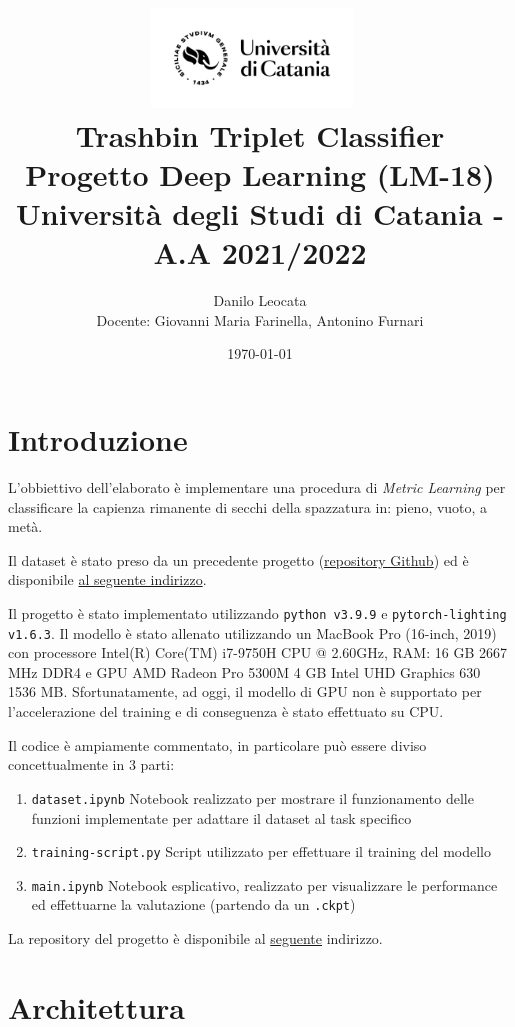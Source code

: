\documentclass[11pt]{article}
\title{ %
\includegraphics[width=0.4\textwidth]{UniCT-Logo-Nero}~\\
Trashbin Triplet Classifier \\ 
\large Progetto Deep Learning (LM-18) \\ Università degli Studi di Catania - A.A 2021/2022 \\
}
\author{ Danilo Leocata \\ Docente: Giovanni Maria Farinella, Antonino Furnari}
\date{\today}
\begin{document}
\maketitle	
\pagebreak


\section{Introduzione}

L'obbiettivo dell'elaborato è implementare una procedura di \textit{Metric Learning} per classificare la 
capienza rimanente di secchi della spazzatura in: pieno, vuoto, a metà.

Il dataset è stato preso da un precedente progetto (\href{https://github.com/khalld/trashbin-classifier}{repository Github}) ed è disponibile \href{https://drive.google.com/drive/folders/11SGtZrM8BWJDPOcnKR7RjLJs0dJOfSCA?usp=sharing}{al seguente indirizzo}.

Il progetto è stato implementato utilizzando \texttt{python v3.9.9} e \texttt{pytorch-lighting v1.6.3}. Il modello è stato allenato utilizzando un MacBook Pro (16-inch, 2019) con processore Intel(R) Core(TM) i7-9750H CPU @ 2.60GHz, RAM: 16 GB 2667 MHz DDR4 e GPU AMD Radeon Pro 5300M 4 GB
Intel UHD Graphics 630 1536 MB. Sfortunatamente, ad oggi, il modello di GPU non è supportato per l'accelerazione del training e di conseguenza è stato effettuato su CPU.

Il codice è ampiamente commentato, in particolare può essere diviso concettualmente in 3 parti:

\begin{enumerate}
    \item \texttt{dataset.ipynb} Notebook realizzato per mostrare il funzionamento delle funzioni implementate per adattare il dataset al task specifico
    \item \texttt{training-script.py} Script utilizzato per effettuare il training del modello
    \item \texttt{main.ipynb} Notebook esplicativo, realizzato per visualizzare le performance ed effettuarne la valutazione (partendo da un \texttt{.ckpt})
\end{enumerate}

La repository del progetto è disponibile al \href{https://github.com/khalld/triplet-trashbin-classifier}{seguente} indirizzo.


\section{Architettura}
\end{document}
